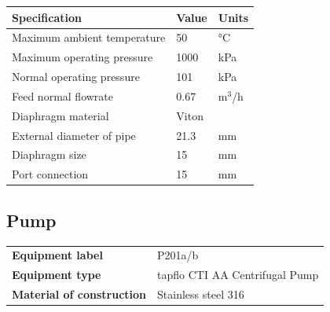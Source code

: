 \begin{table}[H]
\centering
\begin{tabular}{@{}l|l|l@{}}
\toprule
\textbf{Specification}                    & \textbf{Value} & \textbf{Units} \\ \midrule
Maximum ambient temperature                               & 50             & °C             \\ \midrule
Maximum operating pressure                  & 1000        & kPa        \\ \midrule
Normal operating pressure       & 101         &     kPa           \\ \midrule
Feed normal flowrate                      & 0.67      & m$^3$/h           \\ \midrule
Diaphragm material   \cite{noauthor_diaphragm_nodate}                & Viton           &            \\ \midrule
External diameter of pipe                      & 21.3     & mm            \\ \midrule
Diaphragm size & 15     & mm           \\ \midrule
Port connection       & 15         & mm                \\ \bottomrule
\end{tabular}
\end{table}

\newpage
\subsection{Pump}

\begin{table}[H]
    \centering
    \begin{tabular}{@{}l|l@{}}
    \toprule
      \textbf{Equipment label}  & P201a/b \\
       \textbf{Equipment type}  & tapflo CTI AA Centrifugal Pump \cite{tapflo_cti_nodate}\\
       \textbf{Material of construction} & Stainless steel 316 \\
       \bottomrule
    \end{tabular}
\end{table}

